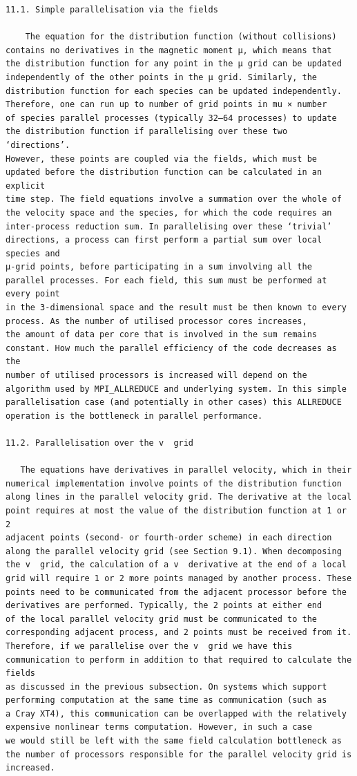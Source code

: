 \documentclass[a4paper]{article}
\newcommand{\gkwpagefont}{\fontsize{6.0pt}{7.55pt}\selectfont}
\begin{document}
\begin{Verbatim}[fontsize=\gkwpagefont]
11.1. Simple parallelisation via the fields

    The equation for the distribution function (without collisions) contains no derivatives in the magnetic moment μ, which means that
the distribution function for any point in the μ grid can be updated independently of the other points in the μ grid. Similarly, the
distribution function for each species can be updated independently. Therefore, one can run up to number of grid points in mu × number
of species parallel processes (typically 32–64 processes) to update the distribution function if parallelising over these two ‘directions’.
However, these points are coupled via the fields, which must be updated before the distribution function can be calculated in an explicit
time step. The field equations involve a summation over the whole of the velocity space and the species, for which the code requires an
inter-process reduction sum. In parallelising over these ‘trivial’ directions, a process can first perform a partial sum over local species and
μ-grid points, before participating in a sum involving all the parallel processes. For each field, this sum must be performed at every point
in the 3-dimensional space and the result must be then known to every process. As the number of utilised processor cores increases,
the amount of data per core that is involved in the sum remains constant. How much the parallel efficiency of the code decreases as the
number of utilised processors is increased will depend on the algorithm used by MPI_ALLREDUCE and underlying system. In this simple
parallelisation case (and potentially in other cases) this ALLREDUCE operation is the bottleneck in parallel performance.

11.2. Parallelisation over the v  grid

   The equations have derivatives in parallel velocity, which in their numerical implementation involve points of the distribution function
along lines in the parallel velocity grid. The derivative at the local point requires at most the value of the distribution function at 1 or 2
adjacent points (second- or fourth-order scheme) in each direction along the parallel velocity grid (see Section 9.1). When decomposing
the v  grid, the calculation of a v  derivative at the end of a local grid will require 1 or 2 more points managed by another process. These
points need to be communicated from the adjacent processor before the derivatives are performed. Typically, the 2 points at either end
of the local parallel velocity grid must be communicated to the corresponding adjacent process, and 2 points must be received from it.
Therefore, if we parallelise over the v  grid we have this communication to perform in addition to that required to calculate the fields
as discussed in the previous subsection. On systems which support performing computation at the same time as communication (such as
a Cray XT4), this communication can be overlapped with the relatively expensive nonlinear terms computation. However, in such a case
we would still be left with the same field calculation bottleneck as the number of processors responsible for the parallel velocity grid is
increased.


\end{Verbatim}
\end{document}
